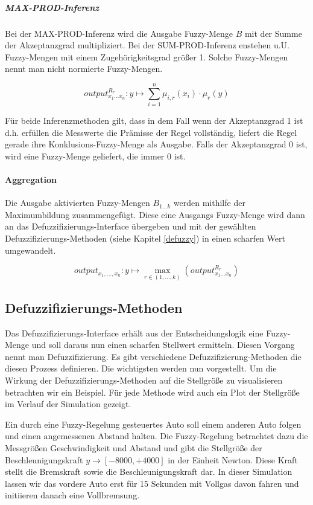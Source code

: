 \documentclass[12pt,a4paper,bibliography=totocnumbered,listof=totocnumbered]{scrartcl}
\theoremstyle{Umgebung}
\begin{document}
\subparagraph{MAX-PROD-Inferenz}

Bei der MAX-PROD-Inferenz wird die Ausgabe Fuzzy-Menge $B$ mit der Summe der Akzeptanzgrad multipliziert. Bei der SUM-PROD-Inferenz enstehen u.U. Fuzzy-Mengen mit einem Zugehörigkeitsgrad größer 1. Solche Fuzzy-Mengen nennt man nicht normierte Fuzzy-Mengen.

\begin{equation}
output^{R_r}_{x_1...x_n}:  y \mapsto \sum_{i = 1}^{n} \mu_{i,r}(x_i) \cdot \mu_r(y)
\end{equation}

Für beide Inferenzmethoden gilt, dass in dem Fall wenn der Akzeptanzgrad 1 ist d.h. erfüllen die Messwerte die Prämisse der Regel vollständig, liefert die Regel gerade ihre Konklusions-Fuzzy-Menge als Ausgabe. Falls der Akzeptanzgrad 0 ist, wird eine Fuzzy-Menge geliefert, die immer 0 ist.

\paragraph{Aggregation}

Die Ausgabe aktivierten Fuzzy-Mengen $B_{1...k}$ werden mithilfe der Maximumbildung zusammengefügt. Diese eine Ausgangs Fuzzy-Menge wird dann an das Defuzzifizierungs-Interface übergeben und mit der gewählten Defuzzifizierungs-Methoden (siehe Kapitel \ref{defuzzy}) in einen scharfen Wert umgewandelt.

\begin{equation}
	output_{x_1,..., x_n}: y \mapsto \max_{r \in (1,...,k)}(output^{R_r}_{x_1...x_n})
\end{equation}

\label{defuzzy}
\subsection{Defuzzifizierungs-Methoden}

Das Defuzzifizierungs-Interface erhält aus der Entscheidungslogik eine Fuzzy-Menge und soll daraus nun einen scharfen Stellwert ermitteln. Diesen Vorgang nennt man Defuzzifizierung. Es gibt verschiedene Defuzzifizierung-Methoden die diesen Prozess definieren. Die wichtigsten werden nun vorgestellt. Um die Wirkung der Defuzzifizierungs-Methoden auf die Stellgröße zu visualisieren betrachten wir ein Beispiel. Für jede Methode wird auch ein Plot der Stellgröße im Verlauf der Simulation gezeigt.

\begin{bsp}
	Ein durch eine Fuzzy-Regelung gesteuertes Auto soll einem anderen Auto folgen und einen angemessenen Abstand halten. Die Fuzzy-Regelung betrachtet dazu die Messgrößen Geschwindigkeit und Abstand und gibt die Stellgröße der Beschleunigungskraft $y \rightarrow \left[-8000, +4000\right]$ in der Einheit Newton. Diese Kraft stellt die Bremskraft sowie die Beschleunigungskraft dar. In dieser Simulation lassen wir das vordere Auto erst für 15 Sekunden mit Vollgas davon fahren und initiieren danach eine Vollbremsung.
\end{bsp}
\end{document}
